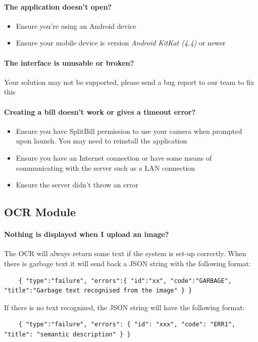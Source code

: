 \documentclass[12pt,a4paper]{article}
\begin{document}
\paragraph{The application doesn't open?}
\begin{itemize}
\item Ensure you're using an Android device 
\item Ensure your mobile device is version \emph{Android KitKat (4.4)} or newer
\end{itemize}

\paragraph{The interface is unusable or broken?}
Your solution may not be supported, please send a bug report to our team to fix this 
\paragraph{Creating a bill doesn't work or gives a timeout error?}
\begin{itemize}
\item Ensure you have SplitBill permission to use your camera when prompted upon launch. You may need to reinstall the application
\item Ensure you have an Internet connection or have some means of communicating with the server such as a LAN connection
\item Ensure the server didn't throw an error
\end{itemize}
    
    \subsection{OCR Module} 
    \paragraph{Nothing is displayed when I upload an image?}
    The OCR will always return some text if the system is set-up correctly. When there is garbage text it will send back a JSON string with the following format: 
    \begin{lstlisting}
    { "type":"failure", "errors":{ "id":"xx", "code":"GARBAGE", "title":"Garbage text recognised from the image" } }
    \end{lstlisting}
    
    If there is no text recognized, the JSON string will have the following format:
    \begin{lstlisting}
    { "type":"failure", "errors": { "id": "xxx", "code": "ERR1", "title": "semantic description" } }
    \end{lstlisting}
    
\end{document}
